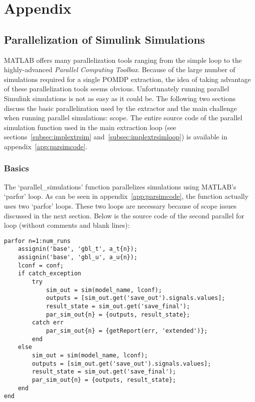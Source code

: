 \chapter{Appendix}


\section{Parallelization of Simulink Simulations}
\label{app:parallel}

MATLAB offers many parallelization tools ranging from the simple  loop to the highly-advanced \textit{Parallel Computing Toolbox}. Because of the large number of simulations required for a single POMDP extraction, the idea of taking advantage of these parallelization tools seems obvious. Unfortunately running parallel Simulink simulations is not as easy as it could be. The following two sections discuss the basic parallelization used by the extractor and the main challenge when running parallel simulations: scope. The entire source code of the parallel simulation function used in the main extraction loop (see sections~\ref{subsec:implextrsim} and~\ref{subsec:implextrsimloop}) is available in appendix~\ref{app:parsimcode}.

\subsection{Basics}

The `parallel\_simulations' function parallelizes simulations using MATLAB's `parfor' loop. As can be seen in appendix~\ref{app:parsimcode}, the function actually uses two `parfor' loops. These two loops are necessary because of scope issues discussed in the next section. Below is the source code of the second parallel for loop (without comments and blank lines):

\begin{lstlisting}
parfor n=1:num_runs
    assignin('base', 'gbl_t', a_t{n});
    assignin('base', 'gbl_u', a_u{n});
    lconf = conf;
    if catch_exception
        try
            sim_out = sim(model_name, lconf);
            outputs = [sim_out.get('save_out').signals.values];
            result_state = sim_out.get('save_final');            
            par_sim_out{n} = {outputs, result_state};
        catch err
            par_sim_out{n} = {getReport(err, 'extended')};
        end
    else
        sim_out = sim(model_name, lconf);
        outputs = [sim_out.get('save_out').signals.values];
        result_state = sim_out.get('save_final');
        par_sim_out{n} = {outputs, result_state};
    end
end
\end{lstlisting}

